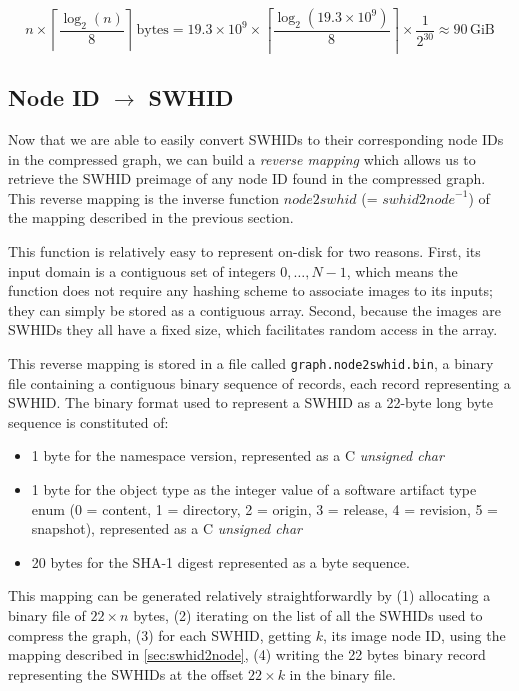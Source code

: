 \[
    n \times \left\lceil{\frac{\log_2(n)}{8}}\right\rceil\,\mathrm{bytes}
    = 19.3 \times 10^9 \times
        \left\lceil{\frac{\log_2(19.3 \times 10^9)}{8}}\right\rceil
        \times \frac{1}{2^{30}}
    \approx 90\,\mathrm{GiB}
\]

\subsection{Node ID $\to$ SWHID}%
\label{sec:node2swhid}

Now that we are able to easily convert \glspl{SWHID} to their corresponding
node IDs in the compressed graph, we can build a \emph{reverse mapping} which
allows us to retrieve the \gls{SWHID} preimage of any node ID found in the
compressed graph. This reverse mapping is the inverse function
$\mathit{node2swhid}$ (= $\mathit{swhid2node}^{-1}$) of the mapping
described in the previous section.

This function is relatively easy to represent on-disk for two reasons. First,
its input domain is a contiguous set of integers ${0,\ldots,N-1}$, which means
the function does not require any hashing scheme to associate images to its
inputs; they can simply be stored as a contiguous array. Second, because the
images are \glspl{SWHID} they all have a fixed size, which facilitates random
access in the array.

This reverse mapping is stored in a file called \texttt{graph.node2swhid.bin},
a binary file containing a contiguous binary sequence of records, each record
representing a \gls{SWHID}. The binary format used to represent a \gls{SWHID}
as a 22-byte long byte sequence is constituted of:

\begin{itemize}
    \item 1 byte for the namespace version, represented as a C \emph{unsigned
        char}
    \item 1 byte for the object type as the integer value of a software
        artifact type enum (0 = content, 1 = directory, 2 = origin, 3 =
        release, 4 = revision, 5 = snapshot), represented as a C \emph{unsigned
        char}
    \item 20 bytes for the SHA-1 digest represented as a byte sequence.
\end{itemize}

This mapping can be generated relatively straightforwardly by (1) allocating a
binary file of $22 \times n$ bytes, (2) iterating on the list of all the
\glspl{SWHID} used to compress the graph, (3) for each \gls{SWHID}, getting
$k$, its image node ID, using the mapping described in \cref{sec:swhid2node},
(4) writing the 22 bytes binary record representing the \glspl{SWHID} at the
offset $22 \times k$ in the binary file.

